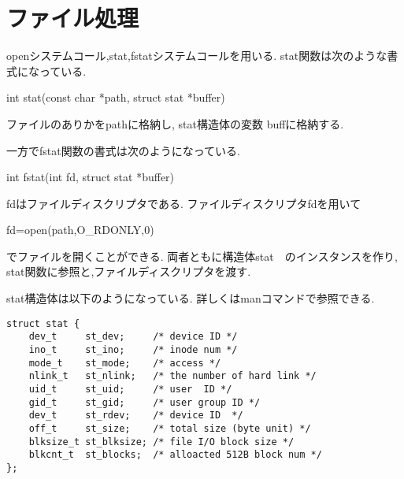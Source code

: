 \documentclass[a4paper]{article}%
\begin{document}
\section{ファイル処理}
openシステムコール,stat,fstatシステムコールを用いる.
stat関数は次のような書式になっている.

int stat(const char *path, struct stat *buffer)

ファイルのありかをpathに格納し, stat構造体の変数 buffに格納する.

一方でfstat関数の書式は次のようになっている.

int fstat(int fd, struct stat *buffer)

fdはファイルディスクリプタである.
ファイルディスクリプタfdを用いて

fd=open(path,O\_RDONLY,0) 

でファイルを開くことができる.
両者ともに構造体stat　のインスタンスを作り, stat関数に参照と,ファイルディスクリプタを渡す.

stat構造体は以下のようになっている. 詳しくはmanコマンドで参照できる.
\begin{lstlisting}[caption=structStat, label=structStat]
struct stat {
    dev_t     st_dev;     /* device ID */
    ino_t     st_ino;     /* inode num */
    mode_t    st_mode;    /* access */
    nlink_t   st_nlink;   /* the number of hard link */
    uid_t     st_uid;     /* user  ID */
    gid_t     st_gid;     /* user group ID */
    dev_t     st_rdev;    /* device ID  */
    off_t     st_size;    /* total size (byte unit) */
    blksize_t st_blksize; /* file I/O block size */
    blkcnt_t  st_blocks;  /* alloacted 512B block num */
};
 \end{lstlisting}
\end{document}

